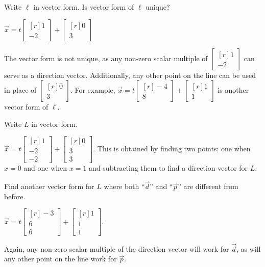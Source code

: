 \documentclass{problemset}
\newcommand{\mat}[1]{\begin{bmatrix*}[r]#1\end{bmatrix*}}
\begin{document}
	\begin{parts}
		\item Write $\ell$ in vector form. Is vector form of $\ell$ unique?
			\begin{solution}
				$\vec x = t \mat{1 \\ -2} + \mat{0 \\ 3}$

				The vector form is not unique, as any non-zero scalar multiple of
				$\mat{1 \\ -2}$ can serve as a direction vector. Additionally,
				any other point on the line can be used in place of
				$\mat{0 \\3}$. For example,  $\vec x = t \mat{-4 \\ 8} + \mat{1 \\ 1}$
				is another vector form of $\ell$.
			\end{solution}
		\item Write $L$ in vector form.
			\begin{solution}[inline]
				$\vec x = t\mat{1 \\ -2 \\ -2} + \mat{0 \\ 3 \\ 3}$. This is obtained
				by finding two points: one when $x=0$ and one when $x=1$ and subtracting
				them to find a direction vector for $L$.
			\end{solution}
		\item Find another vector form for $L$ where both ``$\vec d$'' and
			``$\vec p$'' are different from before.
			\begin{solution}
				$\vec x = t \mat{-3 \\ 6 \\ 6} + \mat{1 \\ 1 \\ 1}$.

				Again, any non-zero scalar multiple of the direction vector
				will work for $\vec d$, as will any other point on the line
				work for $\vec p$.
			\end{solution}
	\end{parts}
\end{document}
